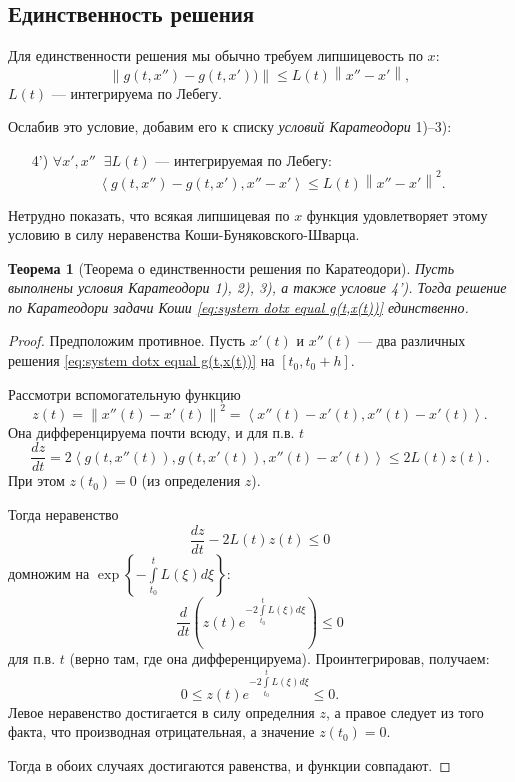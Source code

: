 \documentclass[12pt, a4paper]{article}
\theoremstyle{rusdef}
\newtheorem{theorem}{Теорема}
\newcommand\scalar[1]{\left < #1 \right >} %
\newcommand{\norm}[1]{\left\lVert #1 \right\rVert} %
\begin{document}
\subsection*{Единственность решения}
Для единственности решения мы обычно требуем липшицевость по $x$:
$$
\norm{g(t,x'') - g(t,x'))} \leqslant L(t) \norm{x'' - x'},
$$
$L(t)$ --- интегрируема по Лебегу.

Ослабив это условие, добавим его к списку \textit{условий Каратеодори} 1)--3):
\begin{itemize}
\item[4')] $\forall x', x'' \;\; \exists L(t)$ --- интегрируемая по Лебегу: 
$$
\scalar{g(t, x'') - g(t,x'), x'' - x'} \leqslant L(t) \norm{x'' - x'}^2.
$$ 
\end{itemize}

Нетрудно показать, что всякая липшицевая по $x$ функция удовлетворяет этому условию в силу неравенства Коши-Буняковского-Шварца.

\begin{theorem}[Теорема о единственности решения по Каратеодори]
Пусть выполнены условия Каратеодори 1), 2), 3), а также условие 4'). Тогда решение по Каратеодори задачи Коши \eqref{eq:system dotx equal g(t,x(t))} единственно.
\end{theorem}
\begin{proof}
Предположим противное. Пусть $x'(t)$ и $x''(t)$ --- два различных решения \eqref{eq:system dotx equal g(t,x(t))} на $[t_0, t_0+h]$.

Рассмотри вспомогательную функцию
$$
z(t) = \norm{x''(t) - x'(t)}^2 = \scalar{x''(t) - x'(t), x''(t) - x'(t)}.
$$
Она дифференцируема почти всюду, и для п.в. $t$
$$
\frac{dz}{dt} = 2 \scalar{g(t, x''(t)), g(t, x'(t)) , x''(t) - x'(t)} \leqslant 2 L(t) z(t).
$$
При этом $z(t_0) = 0$ (из определения $z$).

Тогда неравенство
$$
\frac{dz}{dt} - 2 L(t) z(t) \leqslant 0
$$
домножим на $\exp\left\{-\int\limits_{t_0}^{t} L(\xi) d\xi \right\}$:
$$
\frac{d}{dt} \left( z(t) e^{- 2 \int\limits_{t_0}^{t} L(\xi) d\xi} \right) \leqslant 0
$$
для п.в. $t$ (верно там, где она дифференцируема). Проинтегрировав, получаем:
$$
0 \leqslant z(t) e^{- 2 \int\limits_{t_0}^{t} L(\xi) d\xi} \leqslant 0.
$$
Левое неравенство достигается в силу определния $z$, а правое следует из того факта, что производная отрицательная, а значение $z(t_0) = 0$.

Тогда в обоих случаях достигаются равенства, и функции совпадают.
\end{proof}
\end{document}
